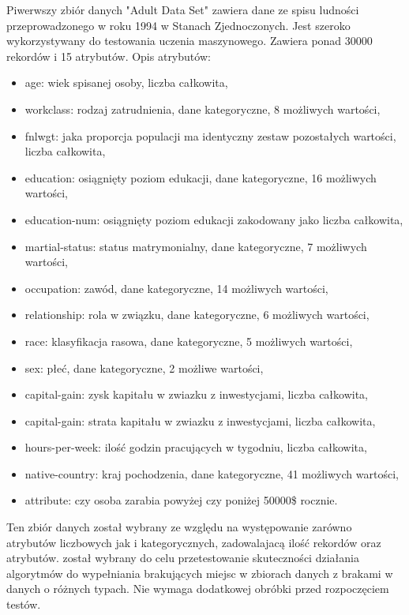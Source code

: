 \documentclass[12pt,twoside]{article}
\begin{document}
Piwerwszy zbiór danych "Adult Data Set" zawiera dane ze spisu ludności przeprowadzonego w roku 1994 w Stanach Zjednoczonych.
Jest szeroko wykorzystywany do testowania uczenia maszynowego.
Zawiera ponad 30000 rekordów i 15 atrybutów. \cite{adult} Opis atrybutów:

\begin{itemize}[label=-,labelsep=0.4cm, leftmargin=1.25cm]
    \item age: wiek spisanej osoby, liczba całkowita,
    \item workclass: rodzaj zatrudnienia, dane kategoryczne, 8 możliwych wartości,
    \item fnlwgt: jaka proporcja populacji ma identyczny zestaw pozostałych wartości, liczba całkowita,
    \item education: osiągnięty poziom edukacji, dane kategoryczne, 16 możliwych wartości,
    \item education-num: osiągnięty poziom edukacji zakodowany jako liczba całkowita,
    \item martial-status: status matrymonialny, dane kategoryczne, 7 możliwych wartości,
    \item occupation: zawód, dane kategoryczne, 14 możliwych wartości,
    \item relationship: rola w związku, dane kategoryczne, 6 możliwych wartości,
    \item race: klasyfikacja rasowa, dane kategoryczne, 5 możliwych wartości,
    \item sex: płeć, dane kategoryczne, 2 możliwe wartości,
    \item capital-gain: zysk kapitału w zwiazku z inwestycjami, liczba całkowita,
    \item capital-gain: strata kapitału w zwiazku z inwestycjami, liczba całkowita,
    \item hours-per-week: ilość godzin pracujących w tygodniu, liczba całkowita,
    \item native-country: kraj pochodzenia, dane kategoryczne, 41 możliwych wartości,
    \item attribute: czy osoba zarabia powyżej czy poniżej 50000\$ rocznie.
\end{itemize}

Ten zbiór danych został wybrany ze względu na występowanie zarówno atrybutów liczbowych jak i kategorycznych,
zadowalajacą ilość rekordów oraz atrybutów.
został wybrany do celu przetestowanie skuteczności działania algorytmów do wypełniania brakujących miejsc
w zbiorach danych z brakami w danych o różnych typach.
Nie wymaga dodatkowej obróbki przed rozpoczęciem testów.
\end{document}
